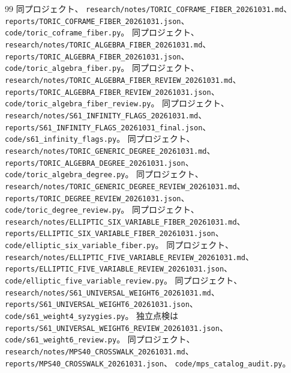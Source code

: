 \documentclass[11pt,a4paper]{ltjsarticle}
\theoremstyle{remark}
\begin{document}
\begin{thebibliography}{99}
 同プロジェクト、
\nolinkurl{research/notes/TORIC_COFRAME_FIBER_20261031.md}、
\nolinkurl{reports/TORIC_COFRAME_FIBER_20261031.json}、
\nolinkurl{code/toric_coframe_fiber.py}。
 同プロジェクト、
\nolinkurl{research/notes/TORIC_ALGEBRA_FIBER_20261031.md}、
\nolinkurl{reports/TORIC_ALGEBRA_FIBER_20261031.json}、
\nolinkurl{code/toric_algebra_fiber.py}。
 同プロジェクト、
\nolinkurl{research/notes/TORIC_ALGEBRA_FIBER_REVIEW_20261031.md}、
\nolinkurl{reports/TORIC_ALGEBRA_FIBER_REVIEW_20261031.json}、
\nolinkurl{code/toric_algebra_fiber_review.py}。
 同プロジェクト、
\nolinkurl{research/notes/S61_INFINITY_FLAGS_20261031.md}、
\nolinkurl{reports/S61_INFINITY_FLAGS_20261031_final.json}、
\nolinkurl{code/s61_infinity_flags.py}。
 同プロジェクト、
\nolinkurl{research/notes/TORIC_GENERIC_DEGREE_20261031.md}、
\nolinkurl{reports/TORIC_ALGEBRA_DEGREE_20261031.json}、
\nolinkurl{code/toric_algebra_degree.py}。
 同プロジェクト、
\nolinkurl{research/notes/TORIC_GENERIC_DEGREE_REVIEW_20261031.md}、
\nolinkurl{reports/TORIC_DEGREE_REVIEW_20261031.json}、
\nolinkurl{code/toric_degree_review.py}。
 同プロジェクト、
\nolinkurl{research/notes/ELLIPTIC_SIX_VARIABLE_FIBER_20261031.md}、
\nolinkurl{reports/ELLIPTIC_SIX_VARIABLE_FIBER_20261031.json}、
\nolinkurl{code/elliptic_six_variable_fiber.py}。
 同プロジェクト、
\nolinkurl{research/notes/ELLIPTIC_FIVE_VARIABLE_REVIEW_20261031.md}、
\nolinkurl{reports/ELLIPTIC_FIVE_VARIABLE_REVIEW_20261031.json}、
\nolinkurl{code/elliptic_five_variable_review.py}。
 同プロジェクト、
\nolinkurl{research/notes/S61_UNIVERSAL_WEIGHT6_20261031.md}、
\nolinkurl{reports/S61_UNIVERSAL_WEIGHT6_20261031.json}、
\nolinkurl{code/s61_weight4_syzygies.py}。
独立点検は\nolinkurl{reports/S61_UNIVERSAL_WEIGHT6_REVIEW_20261031.json}、
\nolinkurl{code/s61_weight6_review.py}。
 同プロジェクト、
\nolinkurl{research/notes/MPS40_CROSSWALK_20261031.md}、
\nolinkurl{reports/MPS40_CROSSWALK_20261031.json}、
\nolinkurl{code/mps_catalog_audit.py}。


\end{thebibliography}
\end{document}
